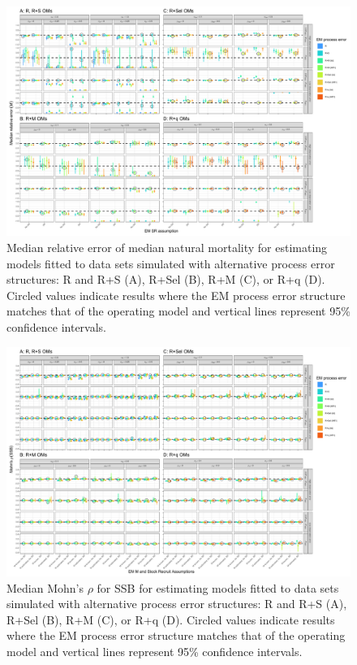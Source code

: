\documentclass[
  12pt,
]{article}
\begin{document}
\begin{landscape}
\begin{figure}
\begin{center}
\includegraphics{M_bias_plots}
\end{center}
\caption{Median relative error of median natural mortality for estimating models fitted to data sets simulated with alternative process error structures: R and R+S (A), R+Sel (B), R+M (C), or R+q (D). Circled values indicate results where the EM process error structure matches that of the operating model and vertical lines represent 95\% confidence intervals.}\label{M_rel_error}
\end{figure}
\end{landscape}

\begin{landscape}
\begin{figure}
\begin{center}
\includegraphics{mohns_rho_ssb_plots}
\end{center}
\caption{Median Mohn's $\rho$ for SSB for estimating models fitted to data sets simulated with alternative process error structures: R and R+S (A), R+Sel (B), R+M (C), or R+q (D). Circled values indicate results where the EM process error structure matches that of the operating model and vertical lines represent 95\% confidence intervals.}\label{mohns_rho_ssb}
\end{figure}
\end{landscape}
\end{document}
